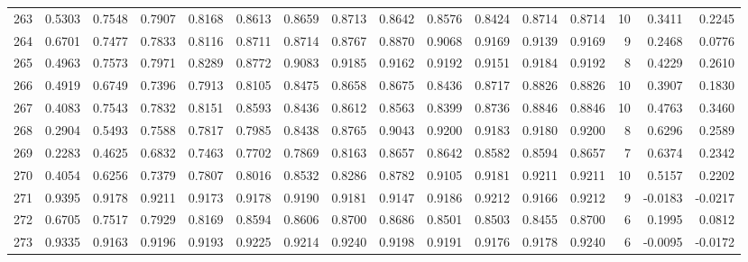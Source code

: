 \begin{tabular}{lrrrrrrrrrrrrrrr}
263 &      0.5303 &  0.7548 &  0.7907 &  0.8168 &  0.8613 &  0.8659 &  0.8713 &  0.8642 &  0.8576 &  0.8424 &   0.8714 &     0.8714 &     10 &                    0.3411 &                     0.2245 \\
264 &      0.6701 &  0.7477 &  0.7833 &  0.8116 &  0.8711 &  0.8714 &  0.8767 &  0.8870 &  0.9068 &  0.9169 &   0.9139 &     0.9169 &      9 &                    0.2468 &                     0.0776 \\
265 &      0.4963 &  0.7573 &  0.7971 &  0.8289 &  0.8772 &  0.9083 &  0.9185 &  0.9162 &  0.9192 &  0.9151 &   0.9184 &     0.9192 &      8 &                    0.4229 &                     0.2610 \\
266 &      0.4919 &  0.6749 &  0.7396 &  0.7913 &  0.8105 &  0.8475 &  0.8658 &  0.8675 &  0.8436 &  0.8717 &   0.8826 &     0.8826 &     10 &                    0.3907 &                     0.1830 \\
267 &      0.4083 &  0.7543 &  0.7832 &  0.8151 &  0.8593 &  0.8436 &  0.8612 &  0.8563 &  0.8399 &  0.8736 &   0.8846 &     0.8846 &     10 &                    0.4763 &                     0.3460 \\
268 &      0.2904 &  0.5493 &  0.7588 &  0.7817 &  0.7985 &  0.8438 &  0.8765 &  0.9043 &  0.9200 &  0.9183 &   0.9180 &     0.9200 &      8 &                    0.6296 &                     0.2589 \\
269 &      0.2283 &  0.4625 &  0.6832 &  0.7463 &  0.7702 &  0.7869 &  0.8163 &  0.8657 &  0.8642 &  0.8582 &   0.8594 &     0.8657 &      7 &                    0.6374 &                     0.2342 \\
270 &      0.4054 &  0.6256 &  0.7379 &  0.7807 &  0.8016 &  0.8532 &  0.8286 &  0.8782 &  0.9105 &  0.9181 &   0.9211 &     0.9211 &     10 &                    0.5157 &                     0.2202 \\
271 &      0.9395 &  0.9178 &  0.9211 &  0.9173 &  0.9178 &  0.9190 &  0.9181 &  0.9147 &  0.9186 &  0.9212 &   0.9166 &     0.9212 &      9 &                   -0.0183 &                    -0.0217 \\
272 &      0.6705 &  0.7517 &  0.7929 &  0.8169 &  0.8594 &  0.8606 &  0.8700 &  0.8686 &  0.8501 &  0.8503 &   0.8455 &     0.8700 &      6 &                    0.1995 &                     0.0812 \\
273 &      0.9335 &  0.9163 &  0.9196 &  0.9193 &  0.9225 &  0.9214 &  0.9240 &  0.9198 &  0.9191 &  0.9176 &   0.9178 &     0.9240 &      6 &                   -0.0095 &                    -0.0172 \\

\end{tabular}
